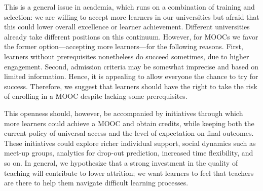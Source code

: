 This is a general issue in academia, which runs on a combination of training and selection: we are willing to
accept more learners in our universities but afraid that this could
lower overall excellence or learner achievement.
Different universities already take different positions on this continuum. However,
for MOOCs we favor the former option---accepting more learners---for the following reasons. 
First,  learners without prerequisites nonetheless do succeed sometimes, due to higher
engagement. Second,  admission criteria may be somewhat
imprecise and based on limited information. Hence, it is appealing to allow
everyone the chance to try for success. Therefore, we suggest
that learners should have the right to take the risk of enrolling in a MOOC despite lacking
some prerequisites. 


This openness should, however, be accompanied by initiatives through which more learners
could achieve a MOOC and obtain credits, while keeping both the current
policy of universal access and the level of expectation on final outcomes. 
These initiatives could explore richer
individual support, social dynamics such as meet-up groups, analytics for
drop-out prediction, increased time flexibility, and so on. In general, we
hypothesize that a strong investment in the quality of teaching will
contribute to lower attrition; we want learners to feel that teachers
are there to help them navigate difficult learning processes. 

